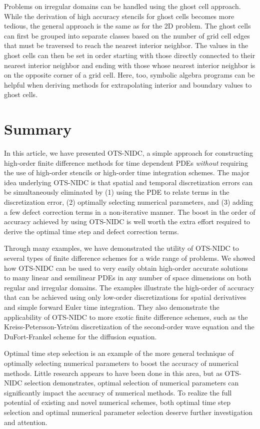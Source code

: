 \documentclass[fleqn,12pt,twoside]{article}
\begin{document}
Problems on irregular domains can be handled using the ghost cell approach. 
While the derivation of high accuracy stencils for ghost cells becomes more
tedious, the general approach is the same as for the 2D problem.  The ghost 
cells can first be grouped into separate classes based on the number of 
grid cell edges that must be traversed to reach the nearest interior neighbor.
The values in the ghost cells can then be set in order starting with those 
directly connected to their nearest interior neighbor and ending with those 
whose nearest interior neighbor is on the opposite corner of a grid cell.
Here, too, symbolic algebra programs can be helpful when deriving methods for 
extrapolating interior and boundary values to ghost cells.


\section{\label{sec:summary} Summary} 
In this article, we have presented OTS-NIDC, a simple approach for 
constructing high-order finite difference methods for time dependent PDEs 
\emph{without} requiring the use of high-order stencils or high-order time 
integration schemes.  The major idea underlying OTS-NIDC is that 
spatial and temporal discretization errors can be simultaneously eliminated
by (1) using the PDE to relate terms in the discretization error, (2)
optimally selecting numerical parameters, and (3) adding a few defect 
correction terms in a non-iterative manner.  The boost in the order of 
accuracy achieved by using OTS-NIDC is well worth the extra effort required to 
derive the optimal time step and defect correction terms. 

Through many examples, we have demonstrated the utility of OTS-NIDC
to several types of finite difference schemes for a wide range of problems.  
We showed how OTS-NIDC can be used to very easily obtain high-order accurate 
solutions to many linear and semilinear PDEs in any number of space dimensions 
on both regular and irregular domains.  The examples illustrate the 
high-order of accuracy that can be achieved using only low-order 
discretizations for spatial derivatives and simple forward Euler time 
integration.  They also demonstrate the applicability of OTS-NIDC to more 
exotic finite difference schemes, such as the Kreiss-Petersson-Ystr\"om 
discretization of the second-order wave equation and the DuFort-Frankel scheme 
for the diffusion equation.

Optimal time step selection is an example of the more general technique
of optimally selecting numerical parameters to boost the accuracy of 
numerical methods.  Little research appears to have been done in this area,
but as OTS-NIDC selection demonstrates, optimal selection of numerical 
parameters can significantly impact the accuracy of numerical methods.  To 
realize the full potential of existing and novel numerical schemes, 
both optimal time step selection and optimal numerical parameter selection 
deserve further investigation and attention.
\end{document}
